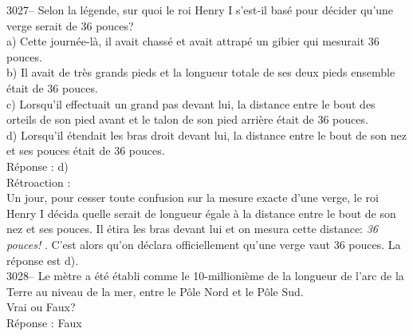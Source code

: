 \documentclass[letterpaper, 12pt]{article}
\begin{document}
3027-- Selon la l\'egende, sur quoi le roi Henry I\ier{} s'est-il bas\'e pour d\'ecider qu'une verge serait de 36 pouces?\\

a) Cette journ\'ee-l\`a, il avait chass\'e et avait attrap\'e un gibier qui mesurait 36 pouces.\\
b) Il avait de tr\`es grands pieds et la longueur totale de ses deux pieds ensemble \'etait de 36 pouces.\\
c) Lorsqu'il effectuait un grand pas devant lui, la distance entre le bout des orteils de son pied avant et le talon de son pied arri\`ere \'etait de 36 pouces.\\
d) Lorsqu'il \'etendait les bras droit devant lui, la distance entre le bout de son nez et ses pouces \'etait de 36 pouces.\\

R\'eponse : d)\\

R\'etroaction :\\
Un jour, pour cesser toute confusion sur la mesure exacte d'une verge, le roi Henry I\ier{} d\'ecida quelle serait de longueur \'egale \`a la distance entre le bout de son nez et ses pouces. Il \'etira les bras devant lui et on mesura cette distance: \og \emph{36 pouces!} \fg. C'est alors qu'on d\'eclara officiellement qu'une verge vaut 36 pouces. La r\'eponse est d).\\



3028-- Le m\`etre a \'et\'e \'etabli comme le 10-millioni\`eme de la longueur de l'arc de la Terre au niveau de la mer, entre le P\^ole Nord et le P\^ole Sud.\\
Vrai ou Faux?\\

R\'eponse : Faux\\
\end{document}

